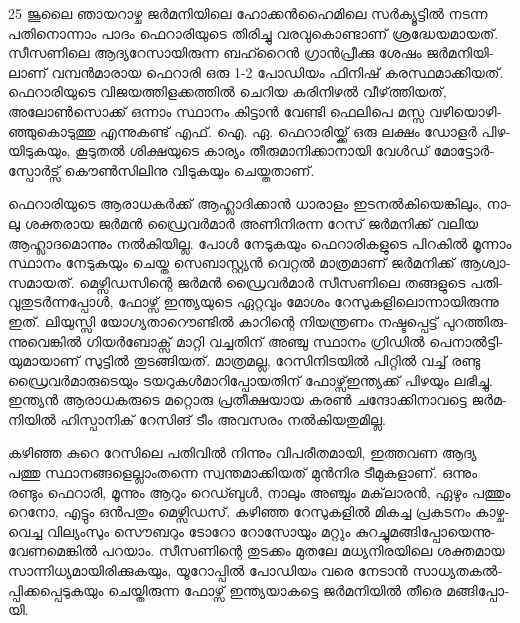 \vskip 2pt

25 ജൂ­ലൈ ഞാ­യ­റാ­ഴ്ച ജര്‍­മ­നി­യി­ലെ ഹോ­ക്കന്‍­ഹൈ­മി­ലെ സര്‍­ക്യൂ­ട്ടില്‍ നട­ന്ന പതി­നൊ­ന്നാം പാ­ദം ഫെ­റാ­രി­യു­ടെ 
തി­രി­ച്ചു വര­വു­കൊ­ണ്ടാ­ണ് ശ്ര­ദ്ധേ­യ­മാ­യ­ത്. സീ­സ­ണി­ലെ ആദ്യ­റേ­സാ­യി­രു­ന്ന ബഹ്റൈന്‍ ഗ്രാന്‍­പ്രീ­ക്കു ശേ­ഷം 
ജര്‍­മ­നി­യി­ലാ­ണ് വമ്പന്‍­മാ­രായ ­ഫെ­റാ­രി­ ഒരു 1-2 പോ­ഡി­യം ഫി­നി­ഷ് കര­സ്ഥ­മാ­ക്കി­യ­ത്. ഫെ­റാ­രി­യു­ടെ 
വി­ജ­യ­ത്തി­ള­ക്ക­ത്തില്‍ ചെ­റിയ കരി­നി­ഴല്‍ വീ­ഴ്‌­ത്തി­യ­ത്, അലോണ്‍­സൊ­ക്ക് ഒന്നാം സ്ഥാ­നം കി­ട്ടാന്‍ വേ­ണ്ടി ­ഫെ­ലി­പെ 
മസ്സ വഴി­യൊ­ഴി­ഞ്ഞു­കൊ­ടു­ത്തു എന്നു­ക­ണ്ട് എഫ്. ഐ. ഏ. ഫെ­റാ­രി­യ്ക്ക് ഒരു ലക്ഷം ഡോ­ളര്‍ പി­ഴ­യി­ടു­ക­യും, കൂ­ടു­തല്‍ 
ശി­ക്ഷ­യു­ടെ കാ­ര്യം തീ­രു­മാ­നി­ക്കാ­നാ­യി വേള്‍­ഡ് മോ­ട്ടോര്‍­സ്പോര്‍­ട്സ് കൌണ്‍­സി­ലി­നു വി­ടു­ക­യും ചെ­യ്ത­താ­ണ്.

­ഫെ­റാ­രി­യു­ടെ ആരാ­ധ­കര്‍­ക്ക് ആഹ്ലാ­ദി­ക്കാന്‍ ധാ­രാ­ളം ഇട­നല്‍­കി­യെ­ങ്കി­ലും, നാ­ലു ശക്ത­രായ ജര്‍­മന്‍ ഡ്രൈ­വര്‍­മാര്‍ 
അണി­നി­ര­ന്ന റേ­സ് ജര്‍­മ­നി­ക്ക് വലിയ ആഹ്ലാ­ദ­മൊ­ന്നും നല്‍­കി­യി­ല്ല. പോള്‍ നേ­ടു­ക­യും ഫെ­റാ­രി­ക­ളു­ടെ പി­റ­കില്‍ 
മൂ­ന്നാം സ്ഥാ­നം നേ­ടു­ക­യും ചെ­യ്ത ­സെ­ബാ­സ്റ്റ്യന്‍ വെ­റ്റല്‍ മാ­ത്ര­മാ­ണ് ജര്‍­മ­നി­ക്ക് ആശ്വാ­സ­മാ­യ­ത്. മെ­ഴ്സി­ഡ­സി­ന്റെ 
ജര്‍­മന്‍ ഡ്രൈ­വര്‍­മാര്‍ സീ­സ­ണി­ലെ തങ്ങ­ളു­ടെ പതി­വു­തു­ടര്‍­ന്ന­പ്പോള്‍, ഫോ­ഴ്സ് ഇന്ത്യ­യു­ടെ ഏറ്റ­വും മോ­ശം 
റേ­സു­ക­ളി­ലൊ­ന്നാ­യി­രു­ന്നു ഇത്. ലി­യു­സ്സി യോ­ഗ്യ­താ­റൌ­ണ്ടില്‍ കാ­റി­ന്റെ നി­യ­ന്ത്ര­ണം നഷ്ട­പ്പെ­ട്ട് പു­റ­ത്തി­രു­ന്നു­വെ­ങ്കില്‍ 
ഗി­യര്‍­ബോ­ക്സ് മാ­റ്റി വച്ച­തി­ന് അഞ്ചു സ്ഥാ­നം ഗ്രി­ഡില്‍ പെ­നാല്‍­ട്ടി­യു­മാ­യാ­ണ് സു­ട്ടില്‍ തു­ട­ങ്ങി­യ­ത്. മാ­ത്ര­മ­ല്ല, 
റേ­സി­നി­ട­യില്‍ പി­റ്റില്‍ വച്ച് രണ്ടു ഡ്രൈ­വര്‍­മാ­രു­ടെ­യും ടയ­റു­കള്‍­മാ­റി­പ്പോ­യ­തി­ന് ഫോ­ഴ്സ്ഇ­ന്ത്യ­ക്ക് പി­ഴ­യും ലഭി­ച്ചു. 
ഇന്ത്യന്‍ ആരാ­ധ­ക­രു­ടെ മറ്റൊ­രു പ്ര­തീ­ക്ഷ­യായ കരണ്‍ ചന്ദോ­ക്കി­നാ­വ­ട്ടെ ജര്‍­മ­നി­യില്‍ ഹി­സ്പാ­നി­ക് റേ­സി­ങ് ടീം 
അവ­സ­രം നല്‍­കി­യ­തു­മി­ല്ല.

­ക­ഴി­ഞ്ഞ കു­റെ റേ­സി­ലെ പതി­വില്‍ നി­ന്നും വി­പ­രീ­ത­മാ­യി, ഇത്ത­വണ ആദ്യ പത്തു സ്ഥാ­ന­ങ്ങ­ളെ­ല്ലാം­ത­ന്നെ 
സ്വ­ന്ത­മാ­ക്കി­യ­ത് മുന്‍­നിര ടീ­മു­ക­ളാ­ണ്. ഒന്നും രണ്ടും ഫെ­റാ­രി, മൂ­ന്നും ആറും റെ­ഡ്ബുള്‍, നാ­ലും അഞ്ചും മക്‌­ലാ­രന്‍, ഏഴും 
പത്തും ­റെ­നോ­, എട്ടും ഒന്‍­പ­തും മെ­ഴ്സി­ഡ­സ്. കഴി­ഞ്ഞ റേ­സു­ക­ളില്‍ മി­ക­ച്ച പ്ര­ക­ട­നം കാ­ഴ്ച­വെ­ച്ച വി­ല്യം­സും സൌ­ബ­റും 
ടോ­റോ റോ­സോ­യും മറ്റും കു­റ­ച്ചു­മ­ങ്ങി­പ്പോ­യെ­ന്നു­വേ­ണ­മെ­ങ്കില്‍ പറ­യാം. സീ­സ­ണി­ന്റെ തു­ട­ക്കം മു­ത­ലേ മധ്യ­നി­ര­യി­ലെ 
ശക്ത­മായ സാ­ന്നി­ധ്യ­മാ­യി­രി­ക്കു­ക­യും, യൂ­റോ­പ്പില്‍ പോ­ഡി­യം വരെ നേ­ടാന്‍ സാ­ധ്യ­ത­കല്‍­പ്പി­ക്ക­പ്പെ­ടു­ക­യും ചെ­യ്തി­രു­ന്ന 
ഫോ­ഴ്സ് ഇന്ത്യ­യാ­ക­ട്ടെ ജര്‍­മ­നി­യില്‍ തീ­രെ മങ്ങി­പ്പോ­യി­.

